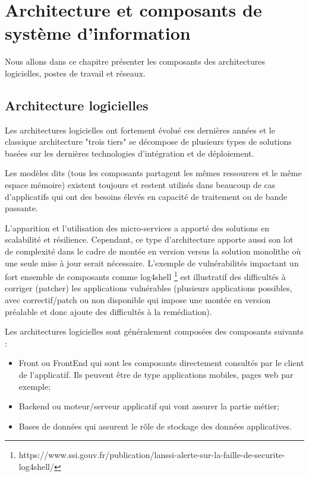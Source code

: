 \section{Architecture et composants de système d’information}
Nous allons dans ce chapitre présenter les composants des architectures logicielles, postes de travail et réseaux. 

\subsection{Architecture logicielles}
Les architectures logicielles ont fortement évolué ces dernières années et le classique architecture "trois tiers" se décompose de plusieurs types de solutions basées sur les dernières technologies d'intégration et de déploiement.

Les modèles dits  (tous les composants partagent les mêmes ressources et le même espace mémoire) existent toujours et restent utilisés dans beaucoup de cas d'applicatifs qui ont des besoins élevés en capacité de traitement ou de bande passante.

L'apparition et l'utilisation des micro-services a apporté des solutions en scalabilité et résilience. Cependant, ce type d'architecture apporte aussi son lot de complexité dans le cadre de montée en version versus la solution monolithe où une seule mise à jour serait nécessaire. L'exemple de vulnérabilités impactant un fort ensemble de composants comme log4shell \footnote{https://www.ssi.gouv.fr/publication/lanssi-alerte-sur-la-faille-de-securite-log4shell/} est illustratif des difficultés à corriger (patcher) les applications vulnérables (plusieurs applications possibles, avec correctif/patch ou non disponible qui impose une montée en version préalable et donc ajoute des difficultés à la remédiation).

Les architectures logicielles sont généralement composées des composants suivants :
\begin{itemize}
    \item Front ou FrontEnd qui sont les composants directement consultés par le client de l'applicatif. Ils peuvent être de type applications mobiles, pages web par exemple;
    \item Backend ou moteur/serveur applicatif qui vont assurer la partie métier;
    \item Bases de données qui assurent le rôle de stockage des données applicatives.
\end{itemize}

